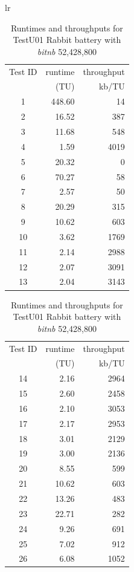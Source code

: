 \documentclass[
  digital,     %
  oneside,     %
  nosansbold,  %
  nocolorbold, %
  nolof,         %
  nolot,         %
]{fithesis4}
\begin{document}
\begin{table}[H]
  \begin{tabularx}{\textwidth}{lr}
    {\begin{tabularx}{0.5\textwidth}{c|r|r}
       Test ID & runtime & throughput\\
         & (TU) &  kb/TU\\
        \midrule
        1 & 448.60 & 14 \\
        2 & 16.52 & 387 \\
        3 & 11.68 & 548 \\
        4 & 1.59 & 4019 \\
        5 & 20.32 & 0 \\
        6 & 70.27 & 58 \\
        7 & 2.57 & 50 \\
        8 & 20.29 & 315 \\
        9 & 10.62 & 603 \\
        10 & 3.62 & 1769 \\
        11 & 2.14 & 2988 \\
        12 & 2.07 & 3091 \\
        13 & 2.04 & 3143 \\
    \end{tabularx}} 
    

    {\begin{tabularx}{0.5\textwidth}{c|r|r}
       Test ID & runtime & throughput\\
         & (TU) &  kb/TU\\
        \midrule 
        14 & 2.16 & 2964 \\
        15 & 2.60 & 2458 \\
        16 & 2.10 & 3053 \\
        17 & 2.17 & 2953 \\
        18 & 3.01 & 2129 \\
        19 & 3.00 & 2136 \\
        20 & 8.55 & 599 \\
        21 & 10.62 & 603 \\
        22 & 13.26 & 483 \\
        23 & 22.71 & 282 \\
        24 & 9.26 & 691 \\
        25 & 7.02 & 912 \\
        26 & 6.08 & 1052 \\
    \end{tabularx}} 
  \end{tabularx}
  \caption{Runtimes and throughputs for TestU01 Rabbit battery with \emph{bit\textunderscore nb} 52,428,800}
  \label{tab:analysis_rabbit_time}
\end{table}
\end{document}
